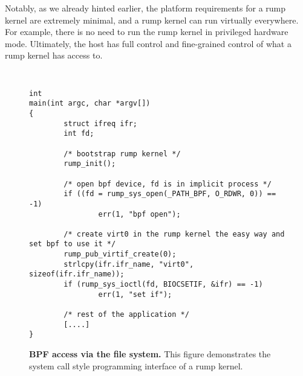 Notably, as we already hinted earlier, the platform
requirements for a rump kernel are extremely minimal, and a rump kernel
can run virtually everywhere.  For example, there is no need to run the
rump kernel in privileged hardware mode.  Ultimately, the host has full
control and fine-grained control of what a rump kernel has access to.


\begin{figure}[]
{\tt \scriptsize
\begin{verbatim}
int
main(int argc, char *argv[])
{
        struct ifreq ifr;
        int fd;

        /* bootstrap rump kernel */
        rump_init();

        /* open bpf device, fd is in implicit process */
        if ((fd = rump_sys_open(_PATH_BPF, O_RDWR, 0)) == -1)
                err(1, "bpf open");

        /* create virt0 in the rump kernel the easy way and set bpf to use it */
        rump_pub_virtif_create(0);
        strlcpy(ifr.ifr_name, "virt0", sizeof(ifr.ifr_name));
        if (rump_sys_ioctl(fd, BIOCSETIF, &ifr) == -1)
                err(1, "set if");

        /* rest of the application */
        [....]
}
\end{verbatim}}
\caption[BPF access via file system]{\textbf{BPF access via the file
system.} This figure demonstrates the system call style programming interface
of a rump kernel.}
\label{fig:bpfvfs}
\end{figure}

